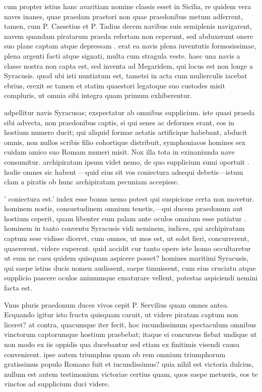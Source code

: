  cum propter istius hanc avaritiam nomine classis esset in Sicilia, re quidem vera naves inanes, quae praedam praetori non quae praedonibus metum adferrent, tamen, cum P. Caesetius et P. Tadius decem navibus suis semiplenis navigarent, navem quandam piratarum praeda refertam non ceperunt, sed abduxerunt onere suo plane captam atque depressam . erat ea navis plena iuventutis formosissimae, plena argenti facti atque signati, multa cum stragula veste. haec una navis a classe nostra non capta est, sed inventa ad Megaridem, qui locus est non longe a Syracusis. quod ubi isti nuntiatum est, tametsi in acta cum mulierculis iacebat ebrius, erexit se tamen et statim quaestori legatoque suo custodes misit compluris, ut omnia sibi integra quam primum exhiberentur.

 adpellitur navis Syracusas; exspectatur ab omnibus supplicium. iste quasi praeda sibi advecta, non praedonibus captis, si qui senes ac deformes erant, eos in hostium numero ducit; qui aliquid formae aetatis artificique habebant, abducit omnis, non nullos scribis filio cohortique distribuit, symphoniacos homines sex cuidam amico suo Romam muneri misit. Nox illa tota in exinaniunda nave consumitur. archipiratam ipsum videt nemo, de quo supplicium sumi oportuit . hodie omnes sic habent —quid eius sit vos coniectura adsequi debetis—istum clam a piratis ob hunc archipiratam pecuniam accepisse.

 ' coniectura est.' iudex esse bonus nemo potest qui suspicione certa non movetur. hominem nostis, consuetudinem omnium tenetis,—qui ducem praedonum aut hostium ceperit, quam libenter eum palam ante oculos omnium esse patiatur . hominem in tanto conventu Syracusis vidi neminem, iudices, qui archipiratam captum sese vidisse diceret, cum omnes, ut mos est, ut solet fieri, concurrerent, quaererent, videre cuperent. quid accidit cur tanto opere iste homo occultaretur ut eum ne casu quidem quisquam aspicere posset? homines maritimi Syracusis, qui saepe istius ducis nomen audissent, saepe timuissent, cum eius cruciatu atque supplicio pascere oculos animumque exsaturare vellent, potestas aspiciendi nemini facta est.

 Vnus pluris praedonum duces vivos cepit P. Servilius quam omnes antea. Ecquando igitur isto fructu quisquam caruit, ut videre piratam captum non liceret? at contra, quacumque iter fecit, hoc iucundissimum spectaculum omnibus vinctorum captorumque hostium praebebat; itaque ei concursus fiebat undique ut non modo ex iis oppidis qua ducebantur sed etiam ex finitimis visendi causa convenirent. ipse autem triumphus quam ob rem omnium triumphorum gratissimus populo Romano fuit et iucundissimus? quia nihil est victoria dulcius, nullum est autem testimonium victoriae certius quam, quos saepe metueris, eos te vinctos ad supplicium duci videre.

